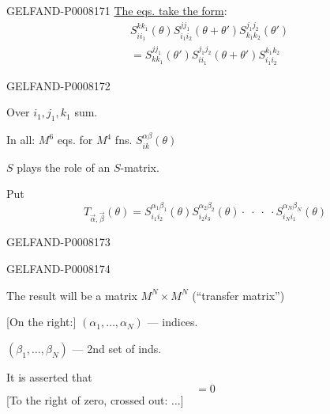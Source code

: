 \begin{GelfandAdjacentEvidence}{GELFAND-P000817}{1}
\uline{The eqs. take the form}:
\begin{equation*}
\begin{aligned}
&S^{kk_1}_{ii_1}(\theta)S^{jj_1}_{i_1i_2}(\theta+\theta')
  S^{j_1j_2}_{k_1k_2}(\theta')\\
&=S^{jj_1}_{kk_1}(\theta')S^{j_1j_2}_{ii_1}(\theta+\theta')
  S^{k_1k_2}_{i_1i_2}
\end{aligned}\tag{2}
\end{equation*}
\end{GelfandAdjacentEvidence}
\begin{GelfandAdjacentEvidence}{GELFAND-P000817}{2}


Over \(i_1,j_1,k_1\) sum.

In all: \(M^6\) eqs. for \(M^4\) fns. \(S^{\alpha\beta}_{ik}(\theta)\)

\(S\) plays the role of an \(S\)-matrix.

Put
\begin{equation*}
T_{\vec{\alpha},\vec{\beta}}(\theta)=
S^{\alpha_1\beta_1}_{i_1i_2}(\theta)
S^{\alpha_2\beta_2}_{i_2i_3}(\theta)
\cdot\;\cdot\;\cdot\;\cdot
S^{\alpha_N\beta_N}_{i_Ni_1}(\theta)\tag{3}
\end{equation*}
\end{GelfandAdjacentEvidence}
\begin{GelfandAdjacentEvidence}{GELFAND-P000817}{3}


\end{GelfandAdjacentEvidence}
\begin{GelfandAdjacentEvidence}{GELFAND-P000817}{4}


The result will be a matrix \(M^N\times M^N\)
(“transfer matrix”)

[On the right:] \((\alpha_1,\ldots,\alpha_N)\) — indices.

\((\beta_1,\ldots,\beta_N)\) — 2nd set of inds.

It is asserted that
\begin{equation*}
[T(\theta),T(\theta')]=0\tag{4}
\end{equation*}
[To the right of zero, crossed out: \(\ldots\)]
\end{GelfandAdjacentEvidence}
